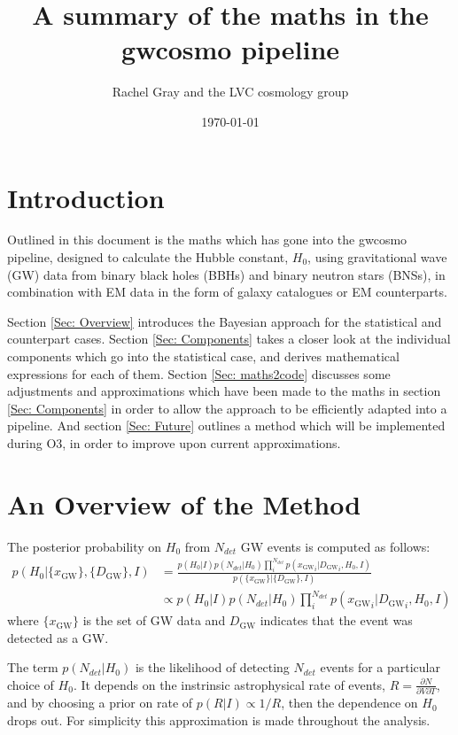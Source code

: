 \documentclass[a4paper,10pt]{article}
\title{A summary of the maths in the gwcosmo pipeline}
\author{Rachel Gray and the LVC cosmology group}
\date{\today} %
\begin{document}
\maketitle

\section{Introduction}
Outlined in this document is the maths which has gone into the gwcosmo pipeline, designed to calculate the Hubble constant, $H_0$, using gravitational wave (GW) data from binary black holes (BBHs) and binary neutron stars (BNSs), in combination with EM data in the form of galaxy catalogues or EM counterparts.

Section \ref{Sec: Overview} introduces the Bayesian approach for the statistical and counterpart cases.  Section \ref{Sec: Components} takes a closer look at the individual components which go into the statistical case, and derives mathematical expressions for each of them.  Section \ref{Sec: maths2code} discusses some adjustments and approximations which have been made to the maths in section \ref{Sec: Components} in order to allow the approach to be efficiently adapted into a pipeline.  And section \ref{Sec: Future} outlines a method which will be implemented during O3, in order to improve upon current approximations.


\section{An Overview of the Method \label{Sec: Overview}}


The posterior probability on $H_0$ from $N_{det}$ GW events is computed as follows:
\begin{equation}
\begin{aligned}
p(H_0|\{x_{\text{GW}}\},\{D_{\text{GW}}\},I)&=\frac{p(H_0|I)p(N_{det}|H_0)\prod_i^{N_{det}} p({x_{\text{GW}}}_i|{D_{\text{GW}}}_i,H_0,I)}{p(\{x_{\text{GW}}\}|\{D_{\text{GW}}\},I)}
\\ &\propto p(H_0|I)p(N_{det}|H_0)\prod_i^{N_{det}} p({x_{\text{GW}}}_i|{D_{\text{GW}}}_i,H_0,I)
\end{aligned}
\end{equation}
where $\{x_{\text{GW}}\}$ is the set of GW data and $D_{\text{GW}}$ indicates that the event was detected as a GW.

The term $p(N_{det}|H_0)$ is the likelihood of detecting $N_{det}$ events for a particular choice of $H_0$.  It depends on the instrinsic astrophysical rate of events, $R=\frac{\partial{N}}{\partial V \partial T}$, and by choosing a prior on rate of $p(R|I) \propto 1/R$, then the dependence on $H_0$ drops out. For simplicity this approximation is made throughout the analysis.
\end{document}
